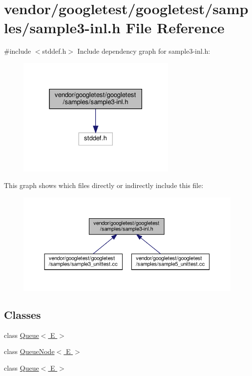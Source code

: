 \hypertarget{sample3-inl_8h}{}\section{vendor/googletest/googletest/samples/sample3-\/inl.h File Reference}
\label{sample3-inl_8h}
{\ttfamily \#include $<$stddef.\+h$>$}\newline
Include dependency graph for sample3-\/inl.h\+:
\nopagebreak
\begin{figure}[H]
\begin{center}
\leavevmode
\includegraphics[width=222pt]{sample3-inl_8h__incl}
\end{center}
\end{figure}
This graph shows which files directly or indirectly include this file\+:
\nopagebreak
\begin{figure}[H]
\begin{center}
\leavevmode
\includegraphics[width=350pt]{sample3-inl_8h__dep__incl}
\end{center}
\end{figure}
\subsection*{Classes}
\begin{DoxyCompactItemize}
\item 
class \hyperlink{class_queue}{Queue$<$ E $>$}
\item 
class \hyperlink{class_queue_node}{Queue\+Node$<$ E $>$}
\item 
class \hyperlink{class_queue}{Queue$<$ E $>$}
\end{DoxyCompactItemize}
